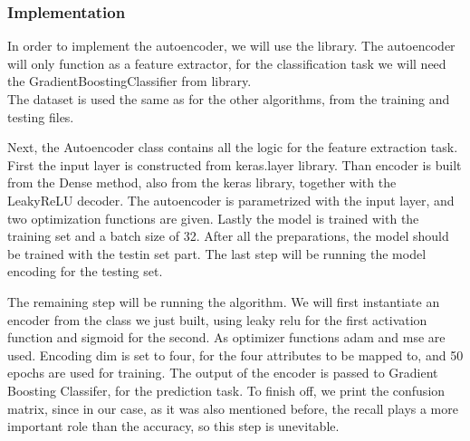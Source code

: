 \subsubsection{Implementation}
In order to implement the autoencoder, we will use the  library. The autoencoder will only function as a feature extractor, for the classification task we will need the {GradientBoostingClassifier} from  library.\\

\noindent The dataset is used the same as for the other algorithms, from the training and testing files.

\vspace{0.5cm}

\vspace{0.5cm}

\noindent Next, the Autoencoder class contains all the logic for the feature extraction task. First the input layer is constructed from keras.layer library. Than encoder is built from the Dense method, also from the keras library, together with the LeakyReLU decoder. The autoencoder is parametrized with the input layer, and two optimization functions are given. Lastly the model is trained with the training set and a batch size of 32. After all the preparations, the model should be trained with the testin set part. The last step will be running the model encoding for the testing set.

\vspace{0.5cm}

\vspace{0.5cm}

\noindent The remaining step will be running the algorithm.
We will first instantiate an encoder from the class we just built, using leaky relu for the first activation function and sigmoid for the second.
As optimizer functions adam and mse are used.
Encoding dim is set to four, for the four attributes to be mapped to, and 50 epochs are used for training.
The output of the encoder is passed to Gradient Boosting Classifer, for the prediction task.
To finish off, we print the confusion matrix, since in our case, as it was also mentioned before, the recall plays a more important role than the accuracy, so this step is unevitable.\\

\vspace{0.5cm}

\vspace{0.5cm}

